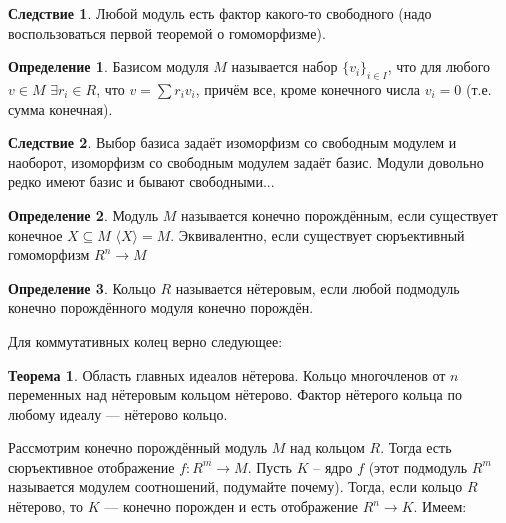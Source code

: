 \documentclass[10pt,a4paper,oneside]{book}
\theoremstyle{definition}
\newtheorem{defn}{Определение}
\newtheorem{thm}{Теорема}
\newtheorem{cor}{Следствие}
\begin{document}
\begin{cor}
Любой модуль есть фактор какого-то свободного (надо воспользоваться первой теоремой о гомоморфизме).
\end{cor}

\begin{defn}
Базисом модуля $M$ называется набор $\{v_i\}_{i\in I}$, что для любого $v\in M$ $\exists r_i\in R$, что  $v=\sum r_i v_i$, причём все, кроме конечного числа $v_i=0$ (т.е. сумма конечная).
\end{defn}

\begin{cor}
Выбор базиса задаёт изоморфизм со свободным модулем и наоборот, изоморфизм со свободным модулем задаёт базис. Модули довольно редко имеют базис и бывают свободными...
\end{cor}

\begin{defn}
Модуль $M$ называется конечно порождённым, если существует конечное  $X \subseteq M$ $\langle X \rangle = M$. Эквивалентно, если существует сюръективный гомоморфизм  $R^n \to M$
\end{defn}

\begin{defn}
Кольцо $R$ называется нётеровым, если любой подмодуль конечно порождённого модуля конечно порождён.
 \end{defn}

Для коммутативных колец верно следующее:

\begin{thm} Область главных идеалов нётерова. Кольцо многочленов от $n$ переменных над нётеровым кольцом нётерово. Фактор нётерого кольца по любому  идеалу --- нётерово кольцо.
\end{thm}

Рассмотрим конечно порождённый модуль $M$ над кольцом $R$. Тогда есть сюръективное отображение $f\colon R^m\to M$. Пусть  $K$ -- ядро $f$ (этот подмодуль $R^m$ называется модулем соотношений, подумайте почему). Тогда, если кольцо $R$ нётерово, то  $K$ --- конечно порожден и есть отображение $R^n \to K$. Имеем:
\begin{center}
\end{center}
\end{document}
